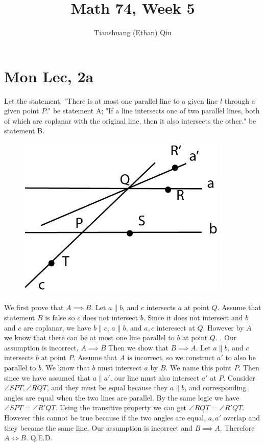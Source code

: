 \documentclass[12pt]{article}
\author{Tianshuang (Ethan) Qiu}
\begin{document}
\title{Math 74, Week 5}
\maketitle


\section{Mon Lec, 2a}
Let the statement: "There is at most one parallel line to a given line $l$ through a given point $P$." be statement A;
\newline
"If a line intersects one of two parallel lines, both of which are coplanar with the original line, then it also intersects the other." be statement B.
\newline
\begin{figure}[h]
    \includegraphics[width = 100mm]{GRAPH1.png}
\end{figure}
\newline
We first prove that $A \implies B$. Let $a \parallel b$, and $c$ intersects $a$ at point $Q$. Assume that statement $B$ is false so $c$ does not intersect $b$. Since it does not intersect and $b$ and $c$ are coplanar, we have $b \parallel c$, $a \parallel b$, and $a, c$ interesect at $Q$. However by $A$ we know that there can be at most one line parallel to $b$ at point $Q$. \lightning. Our assumption is incorrect, $A \implies B$
\newline
Then we show that $B \implies A$. Let $a \parallel b$, and $c$ intersects $b$ at point $P$. Assume that $A$ is incorrect, so we construct $a'$ to also be parallel to $b$. We know that $b$ must intersect $a$ by $B$. We name this point $P$. Then since we have assumed that $a \parallel a'$, our line must also intersect $a'$ at $P$. Consider $\angle SPT, \angle RQT$, and they must be equal because they $a \parallel b$, and corresponding angles are equal when the two lines are parallel. By the same logic we have $\angle SPT = \angle R'QT$.
\newline
Using the transitive property we can get $\angle RQT = \angle R'QT$. However this cannot be true because if the two angles are equal, $a, a'$ overlap and they become the same line. \lightning
\newline
Our assumption is incorrect and $B \implies A$. Therefore $A \iff B$. Q.E.D.
\end{document}
